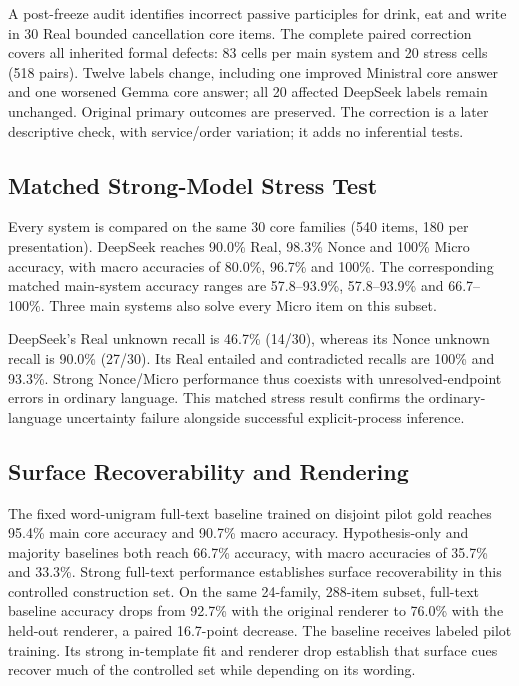 \documentclass[sigconf,anonymous,review]{acmart}
\begin{document}
A post-freeze audit identifies incorrect passive participles for drink, eat and write in 30 Real bounded cancellation core items. The complete paired correction covers all inherited formal defects: 83 cells per main system and 20 stress cells (518 pairs). Twelve labels change, including one improved Ministral core answer and one worsened Gemma core answer; all 20 affected DeepSeek labels remain unchanged. Original primary outcomes are preserved. The correction is a later descriptive check, with service/order variation; it adds no inferential tests.

\subsection{Matched Strong-Model Stress Test}
Every system is compared on the same 30 core families (540 items, 180 per presentation). DeepSeek reaches 90.0\% Real, 98.3\% Nonce and 100\% Micro accuracy, with macro accuracies of 80.0\%, 96.7\% and 100\%. The corresponding matched main-system accuracy ranges are 57.8--93.9\%, 57.8--93.9\% and 66.7--100\%. Three main systems also solve every Micro item on this subset.

DeepSeek's Real unknown recall is 46.7\% (14/30), whereas its Nonce unknown recall is 90.0\% (27/30). Its Real entailed and contradicted recalls are 100\% and 93.3\%. Strong Nonce/Micro performance thus coexists with unresolved-endpoint errors in ordinary language. This matched stress result confirms the ordinary-language uncertainty failure alongside successful explicit-process inference.



\subsection{Surface Recoverability and Rendering}
The fixed word-unigram full-text baseline trained on disjoint pilot gold reaches 95.4\% main core accuracy and 90.7\% macro accuracy. Hypothesis-only and majority baselines both reach 66.7\% accuracy, with macro accuracies of 35.7\% and 33.3\%. Strong full-text performance establishes surface recoverability in this controlled construction set. On the same 24-family, 288-item subset, full-text baseline accuracy drops from 92.7\% with the original renderer to 76.0\% with the held-out renderer, a paired 16.7-point decrease. The baseline receives labeled pilot training. Its strong in-template fit and renderer drop establish that surface cues recover much of the controlled set while depending on its wording.
\end{document}
